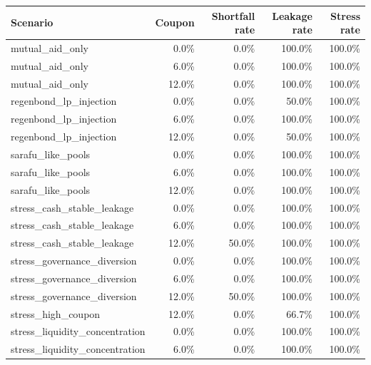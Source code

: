\begingroup
\small
\setlength{\tabcolsep}{3pt}
\begin{tabular}{lrrrr}
\toprule
Scenario & Coupon & Shortfall rate & Leakage rate & Stress rate \\
\midrule
mutual\_aid\_only & 0.0\% & 0.0\% & 100.0\% & 100.0\% \\
mutual\_aid\_only & 6.0\% & 0.0\% & 100.0\% & 100.0\% \\
mutual\_aid\_only & 12.0\% & 0.0\% & 100.0\% & 100.0\% \\
regenbond\_lp\_injection & 0.0\% & 0.0\% & 50.0\% & 100.0\% \\
regenbond\_lp\_injection & 6.0\% & 0.0\% & 100.0\% & 100.0\% \\
regenbond\_lp\_injection & 12.0\% & 0.0\% & 50.0\% & 100.0\% \\
sarafu\_like\_pools & 0.0\% & 0.0\% & 100.0\% & 100.0\% \\
sarafu\_like\_pools & 6.0\% & 0.0\% & 100.0\% & 100.0\% \\
sarafu\_like\_pools & 12.0\% & 0.0\% & 100.0\% & 100.0\% \\
stress\_cash\_stable\_leakage & 0.0\% & 0.0\% & 100.0\% & 100.0\% \\
stress\_cash\_stable\_leakage & 6.0\% & 0.0\% & 100.0\% & 100.0\% \\
stress\_cash\_stable\_leakage & 12.0\% & 50.0\% & 100.0\% & 100.0\% \\
stress\_governance\_diversion & 0.0\% & 0.0\% & 100.0\% & 100.0\% \\
stress\_governance\_diversion & 6.0\% & 0.0\% & 100.0\% & 100.0\% \\
stress\_governance\_diversion & 12.0\% & 50.0\% & 100.0\% & 100.0\% \\
stress\_high\_coupon & 12.0\% & 0.0\% & 66.7\% & 100.0\% \\
stress\_liquidity\_concentration & 0.0\% & 0.0\% & 100.0\% & 100.0\% \\
stress\_liquidity\_concentration & 6.0\% & 0.0\% & 100.0\% & 100.0\% \\
\bottomrule
\end{tabular}
\endgroup
